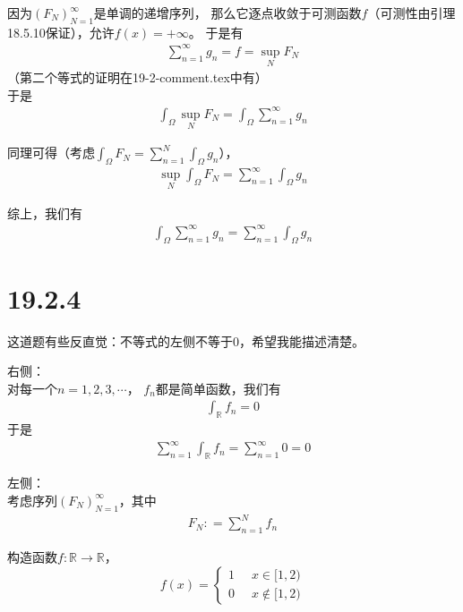 \documentclass{article}
\begin{document}
因为$(F_N)_{N = 1}^\infty$是单调的递增序列，
那么它逐点收敛于可测函数$f$（可测性由引理18.5.10保证），允许$f(x) = +\infty$。
于是有
\begin{align*}
  \sum \limits_{n = 1}^\infty g_n = f = \sup\limits_{N} F_N
\end{align*}
（第二个等式的证明在19-2-comment.tex中有）\\
于是
\begin{align*}
  \int_{\Omega} \sup\limits_{N} F_N  = \int_{\Omega} \sum \limits_{n = 1}^\infty g_n
\end{align*}

同理可得（考虑$\int_{\Omega} F_N = \sum \limits_{n = 1}^N \int_{\Omega} g_n $），
\begin{align*}
  \sup\limits_{N} \int_{\Omega} F_N = \sum \limits_{n = 1}^\infty \int_{\Omega} g_n
\end{align*}

综上，我们有
\begin{align*}
  \int_{\Omega} \sum \limits_{n = 1}^\infty g_n = \sum \limits_{n = 1}^\infty \int_{\Omega} g_n
\end{align*}

\section*{19.2.4}

这道题有些反直觉：不等式的左侧不等于$0$，希望我能描述清楚。

右侧：\\
对每一个$n = 1, 2, 3, \cdots$，
$f_n$都是简单函数，我们有
\begin{align*}
  \int_{\mathbb{R}} f_n = 0
\end{align*}
于是
\begin{align*}
  \sum \limits_{n = 1}^\infty \int_{\mathbb{R}} f_n = \sum \limits_{n = 1}^\infty 0 = 0
\end{align*}

左侧：\\
考虑序列$(F_N)_{N = 1}^\infty$，其中
\begin{align*}
  F_N : = \sum \limits_{n = 1}^N f_n
\end{align*}

构造函数$f: \mathbb{R} \to \mathbb{R}$，
\begin{equation*}
  f(x) = \begin{cases}
    1 & \;\; x \in [1, 2)    \\
    0 & \;\; x \notin [1, 2)
  \end{cases}
\end{equation*}
\end{document}
